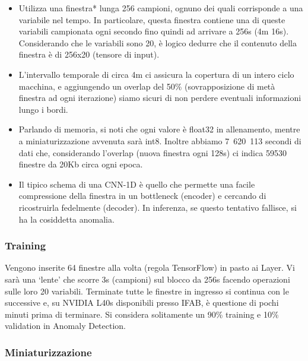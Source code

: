 \begin{itemize}
    \item Utilizza una finestra* lunga 256 campioni, ognuno dei quali corrisponde a una variabile nel tempo. In particolare, questa finestra contiene una di queste variabili campionata ogni secondo fino quindi ad arrivare a 256s (4m 16s). Considerando che le variabili sono 20, è logico dedurre che il contenuto della finestra è di 256x20 (tensore di input).
    \item L’intervallo temporale di circa 4m ci assicura la copertura di un intero ciclo macchina, e aggiungendo un overlap del 50\% (sovrapposizione di metà finestra ad ogni iterazione) siamo sicuri di non perdere eventuali informazioni lungo i bordi.
    \item Parlando di memoria, si noti che ogni valore è float32 in allenamento, mentre a miniaturizzazione avvenuta sarà int8. Inoltre abbiamo 7 620 113 secondi di dati che, considerando l’overlap (nuova finestra ogni 128s) ci indica 59530 finestre da 20Kb circa ogni epoca.
    \item Il tipico schema di una CNN-1D è quello che permette una facile compressione della finestra in un bottleneck (encoder) e cercando di ricostruirla fedelmente (decoder). In inferenza, se questo tentativo fallisce, si ha la cosiddetta anomalia.
\end{itemize}

\subsubsection{Training}

Vengono inserite 64 finestre alla volta (regola TensorFlow) in pasto ai Layer. Vi sarà una ‘lente’ che scorre 3s (campioni) sul blocco da 256s facendo operazioni sulle loro 20 variabili. Terminate tutte le finestre in ingresso si continua con le successive e, su NVIDIA L40s disponibili presso IFAB, è questione di pochi minuti prima di terminare. Si considera solitamente un 90\% training e 10\% validation in Anomaly Detection.

\subsubsection{Miniaturizzazione}

